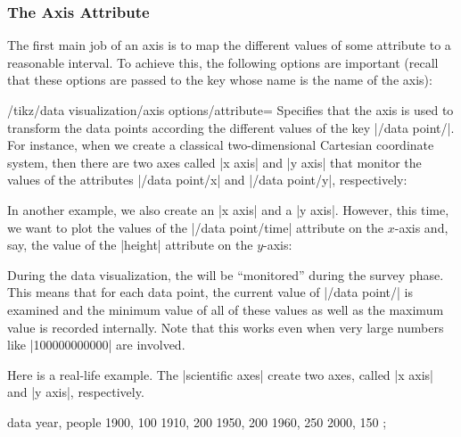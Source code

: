 \subsubsection{The Axis Attribute}
\label{section-dv-axis-attribute}

The first main job of an axis is to map the different values of some
attribute to a reasonable interval. To achieve this, the following
options are important (recall that these options are passed to the key
whose name is the name of the axis):

\begin{key}{/tikz/data visualization/axis options/attribute=}
  Specifies that the axis is used to transform the data points
  according the different values of the key
  |/data point/|. For instance, when we create a
  classical two-dimensional Cartesian coordinate system, then there
  are two axes called |x axis| and |y axis| that monitor the values of
  the attributes |/data point/x| and |/data point/y|, respectively:
\begin{codeexample}
\end{codeexample}
  In another example, we also create an |x axis| and a
  |y axis|. However, this time, we want to plot the values of the
  |/data point/time| attribute on the $x$-axis and, say, the value of
  the |height| attribute on the $y$-axis:
\begin{codeexample}
\end{codeexample}
  During the data visualization, the  will be
  ``monitored'' during the survey phase. This means that for each data
  point, the current value of |/data point/| is
  examined and the minimum value of all of these values as well as the
  maximum value is recorded internally. Note that this works even when
  very large numbers like |100000000000| are involved.

  Here is a real-life example. The |scientific axes| create two axes,
  called |x axis| and |y axis|, respectively.
\begin{codeexample}[]
\tikz \datavisualization [scientific axes,
                          x axis={attribute=people, length=2.5cm, ticks=few},
                          y axis={attribute=year},
                          visualize as scatter]
  data {
    year, people
    1900, 100
    1910, 200
    1950, 200
    1960, 250
    2000, 150
  };
\end{codeexample}
\end{key}


